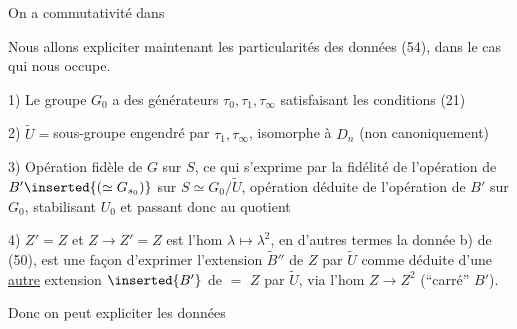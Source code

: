 On a commutativité dans


Nous allons expliciter maintenant les particularités des données (54), dans le cas qui nous occupe.

\noindent{}1) Le groupe $G_0$ a des générateurs $\tau_0,\tau_1,\tau_\infty$ satisfaisant les conditions (21)

2) $\widetilde U={}$sous-groupe engendré par $\tau_1,\tau_\infty$, isomorphe à $D_n$ (non canoniquement)

3) Opération fidèle de $G$ sur $S$, ce qui s'exprime par la fidélité de l'opération de $B'\inserted{(\simeq G_{s_0})}$ sur $S\simeq G_0/\widetilde U$, opération déduite de l'opération de $B'$ sur $G_0$, stabilisant $U_0$ et passant donc au quotient

4) $Z'=Z$ et $Z\longrightarrow Z'=Z$ est l'hom $\lambda\mapsto\lambda^2$, en d'autres termes la donnée b) de (50), est une façon d'exprimer l'extension $\widetilde B''$ de $Z$ par $\widetilde U$ comme déduite d'une \uline{autre} extension $\inserted{B'}$ de $=$ $Z$ par $\widetilde U$,  via l'hom $Z\longrightarrow Z^2$ (``carré''   $B'$).

Donc on peut expliciter les données 

